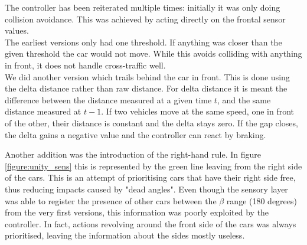 The controller has been reiterated multiple times: initially it was only doing collision avoidance. 
This was achieved by acting directly on the frontal sensor values.\\
The earliest versions only had one threshold. If anything was closer than the given threshold the car would not move.
While this avoids colliding with anything in front, it does not handle cross-traffic well.\\
We did another version which trails behind the car in front.
This is done using the delta distance rather than raw distance.
For delta distance it is meant the difference between the distance measured at a given time $t$, and the same distance measured at $t-1$. 
If two vehicles move at the same speed, one in front of the other, their distance is constant and the delta stays zero.
If the gap closes, the delta gains a negative value and the controller can react by braking. 

Another addition was the introduction of the right-hand rule. In figure \ref{figure:unity_sens} this is represented by the green line leaving from the right side of the cars.
This is an attempt of prioritising cars that have their right side free, thus reducing impacts caused by "dead angles".
Even though the sensory layer was able to register the presence of other cars between the $\beta$ range (180 degrees) from the very first versions, this information was poorly exploited by the controller.
In fact, actions revolving around the front side of the cars was always prioritised, leaving the information about the sides mostly useless.
